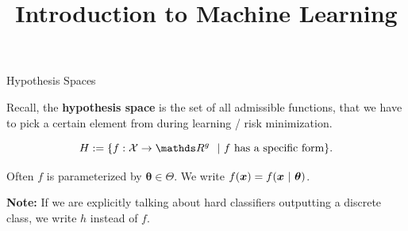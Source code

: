 



\newcommand{\titlefigure}{figure_man/neunet.png}
\newcommand{\learninggoals}{
  \item \textcolor{blue}{XXX}
  \item \textcolor{blue}{XXX}
}

\title{Introduction to Machine Learning}
\date{}




\begin{vbframe} {Hypothesis Spaces}

    Recall, the \textbf{hypothesis space} is the set of all admissible functions, that we have to pick a certain element from during learning / risk minimization.

$$
\Hspace := \{f: \Xspace \to \R^g ~~|~ f \text{ has a specific form}\}. 
$$

Often $f$ is parameterized by $\bm{\theta} \in \Theta$. We write $f(\bm{x}) = f(\bm{x} ~|~ \bm{\theta})$. 

\lz 

\textbf{Note:} If we are explicitly talking about hard classifiers outputting a discrete class, we write $h$ instead of $f$. 


%
\end{vbframe}

